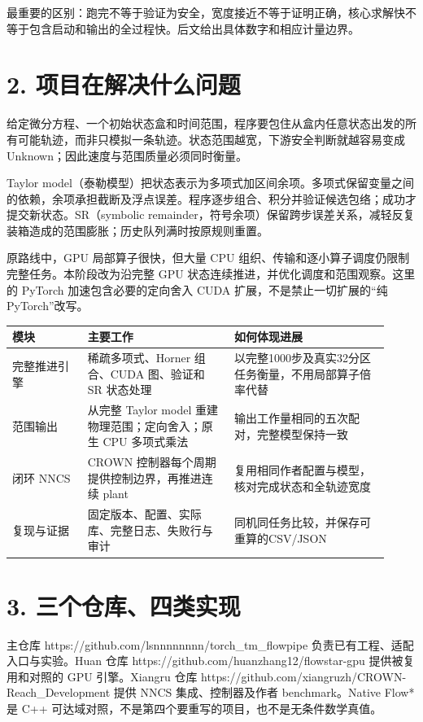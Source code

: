 \documentclass[UTF8,fontset=fandol,11pt,a4paper]{ctexart}
\begin{document}
\normalsize
最重要的区别：跑完不等于验证为安全，宽度接近不等于证明正确，核心求解快不等于包含启动和输出的全过程快。后文给出具体数字和相应计量边界。

\section*{2. 项目在解决什么问题}
给定微分方程、一个初始状态盒和时间范围，程序要包住从盒内任意状态出发的所有可能轨迹，而非只模拟一条轨迹。状态范围越宽，下游安全判断就越容易变成 Unknown；因此速度与范围质量必须同时衡量。

Taylor model（泰勒模型）把状态表示为多项式加区间余项。多项式保留变量之间的依赖，余项承担截断及浮点误差。程序逐步组合、积分并验证候选包络；成功才提交新状态。SR（symbolic remainder，符号余项）保留跨步误差关系，减轻反复装箱造成的范围膨胀；历史队列满时按原规则重置。

原路线中，GPU 局部算子很快，但大量 CPU 组织、传输和逐小算子调度仍限制完整任务。本阶段改为沿完整 GPU 状态连续推进，并优化调度和范围观察。这里的 PyTorch 加速包含必要的定向舍入 CUDA 扩展，不是禁止一切扩展的“纯 PyTorch”改写。

\small
\par\noindent
{\setlength{\tabcolsep}{2pt}\renewcommand{\arraystretch}{1.25}
\begin{tabular}{>{\raggedright\arraybackslash}p{0.184\linewidth}>{\raggedright\arraybackslash}p{0.359\linewidth}>{\raggedright\arraybackslash}p{0.377\linewidth}}
\toprule
\textbf{模块} & \textbf{主要工作} & \textbf{如何体现进展} \\
\midrule
完整推进引擎 & 稀疏多项式、Horner 组合、CUDA 图、验证和 SR 状态处理 & 以完整1000步及真实32分区任务衡量，不用局部算子倍率代替 \\
范围输出 & 从完整 Taylor model 重建物理范围；定向舍入；原生 CPU 多项式乘法 & 输出工作量相同的五次配对，完整模型保持一致 \\
闭环 NNCS & CROWN 控制器每个周期提供控制边界，再推进连续 plant & 复用相同作者配置与模型，核对完成状态和全轨迹宽度 \\
复现与证据 & 固定版本、配置、实际库、完整日志、失败行与审计 & 同机同任务比较，并保存可重算的CSV/\allowbreak{}JSON \\
\bottomrule
\end{tabular}
}
\par

\normalsize
{}\section*{3. 三个仓库、四类实现}
主仓库 https:/\allowbreak{}/\allowbreak{}github.com/\allowbreak{}lsnnnnnnnn/\allowbreak{}torch\_\allowbreak{}tm\_\allowbreak{}flowpipe 负责已有工程、适配入口与实验。Huan 仓库 https:/\allowbreak{}/\allowbreak{}github.com/\allowbreak{}huanzhang12/\allowbreak{}flowstar-gpu 提供被复用和对照的 GPU 引擎。Xiangru 仓库 https:/\allowbreak{}/\allowbreak{}github.com/\allowbreak{}xiangruzh/\allowbreak{}CROWN-Reach\_\allowbreak{}Development 提供 NNCS 集成、控制器及作者 benchmark。Native Flow* 是 C++ 可达域对照，不是第四个要重写的项目，也不是无条件数学真值。
\end{document}
